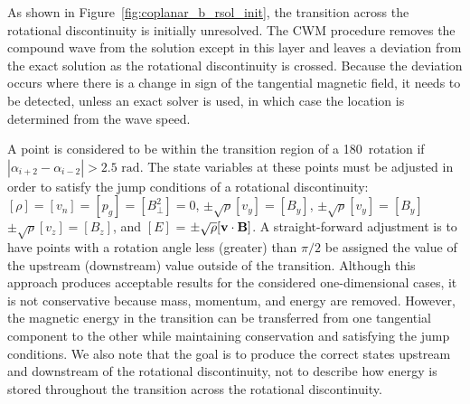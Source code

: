 As shown in Figure~\ref{fig:coplanar_b_rsol_init}, the transition across the rotational discontinuity is initially unresolved.  The CWM procedure removes the compound wave from the solution except in this layer and leaves a deviation from the exact solution as the rotational discontinuity is crossed.   Because the deviation occurs where there is a change in sign of the tangential magnetic field, it needs to be detected, unless an exact solver is used, in which case the location is determined from the wave speed.  

A point is considered to be within the transition region of a 180\degree\, rotation if $| \alpha_{i+2} - \alpha_{i-2}| > 2.5 \text{ rad}$.  The state variables at these points must be adjusted in order to satisfy the jump conditions of a rotational discontinuity: $[\rho] = [v_n] = [p_g] = [B_{\perp}^2] = 0$, $\pm\sqrt{\rho}[v_y] = [B_y]$, $\pm\sqrt{\rho}[v_y] = [B_y]$ $\pm\sqrt{\rho}[v_z] = [B_z]$, and $[E]$ = $\pm\sqrt{\rho}[\mathbf{v}\cdot\mathbf{B}]$.  A straight-forward adjustment is to have points with a rotation angle less (greater) than $\pi/2$ be assigned the value of the upstream (downstream) value outside of the transition.  Although this approach produces acceptable results for the considered one-dimensional cases, it is not conservative because mass, momentum, and energy are removed.  However, the magnetic energy in the transition can be transferred from one tangential component to the other while maintaining conservation and satisfying the jump conditions.  We also note that the goal is to produce the correct states upstream and downstream of the rotational discontinuity, not to describe how energy is stored throughout the transition across the rotational discontinuity.    

